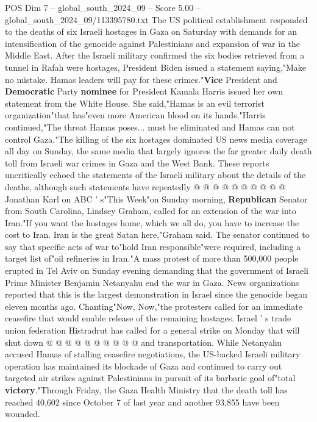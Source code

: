 \begin{textsample}{POS Dim 7 – global\_south\_2024\_09 – Score 5.00 – global\_south\_2024\_09/113395780.txt}  \label{ex:f7_pos_234}
The US political establishment responded to the deaths of six Israeli hostages in Gaza on Saturday with demands for an intensification of the genocide against Palestinians and expansion of war in the Middle East.
After the Israeli military confirmed the six bodies retrieved from a tunnel in Rafah were hostages, President Biden issued a statement saying,"Make no mistake.
Hamas leaders will pay for these crimes."\textbf{Vice} President and \textbf{Democratic} Party \textbf{nominee} for President Kamala Harris issued her own statement from the White House.
She said,"Hamas is an evil terrorist organization"that has"even more American blood on its hands."Harris continued,"The threat Hamas poses... must be eliminated and Hamas can not control Gaza."The killing of the six hostages dominated US news media coverage all day on Sunday, the same media that largely ignores the far greater daily death toll from Israeli war crimes in Gaza and the West Bank.
These reports uncritically echoed the statements of the Israeli military about the details of the deaths, although such statements have repeatedly @ @ @ @ @ @ @ @ @ @ Jonathan Karl on ABC ' s"This Week"on Sunday morning, \textbf{Republican} Senator from South Carolina, Lindsey Graham, called for an extension of the war into Iran."If you want the hostages home, which we all do, you have to increase the cost to Iran.
Iran is the great Satan here,"Graham said.
The senator continued to say that specific acts of war to"hold Iran responsible"were required, including a target list of"oil refineries in Iran."A mass protest of more than 500,000 people erupted in Tel Aviv on Sunday evening demanding that the government of Israeli Prime Minister Benjamin Netanyahu end the war in Gaza.
News organizations reported that this is the largest demonstration in Israel since the genocide began eleven months ago.
Chanting"Now, Now,"the protesters called for an immediate ceasefire that would enable release of the remaining hostages.
Israel ' s trade union federation Histradrut has called for a general strike on Monday that will shut down @ @ @ @ @ @ @ @ @ @ and transportation.
While Netanyahu accused Hamas of stalling ceasefire negotiations, the US-backed Israeli military operation has maintained its blockade of Gaza and continued to carry out targeted air strikes against Palestinians in pursuit of its barbaric goal of"total \textbf{victory}."Through Friday, the Gaza Health Ministry that the death toll has reached 40,602 since October 7 of last year and another 93,855 have been wounded.

\end{textsample}
